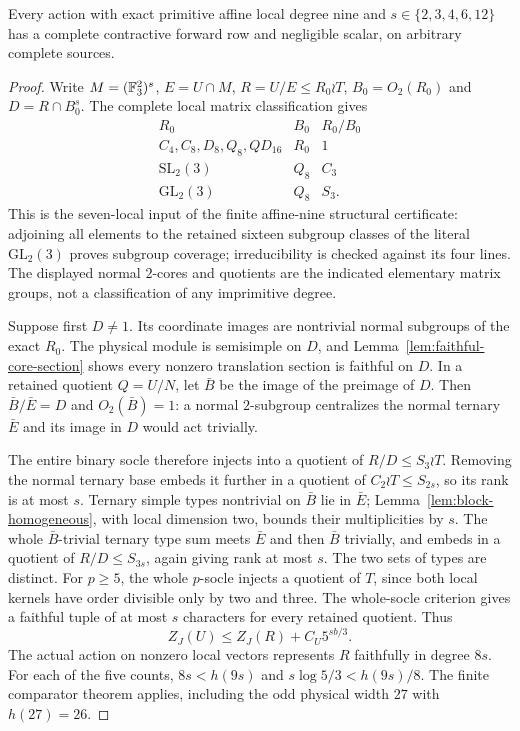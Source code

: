 \begin{theorem}
\label{thm:nine-affine-exceptions}
Every action with exact primitive affine local degree nine and
$s\in\{2,3,4,6,12\}$ has a complete contractive forward row
and negligible scalar, on arbitrary complete sources.
\end{theorem}
\begin{proof}
Write $M=(\mathbb F_3^2)^s$, $E=U\cap M$, $R=U/E\leq R_0\wr T$,
$B_0=O_2(R_0)$ and $D=R\cap B_0^s$. The complete local matrix
classification gives
\[
\begin{array}{c|c|c}
R_0&B_0&R_0/B_0\\\hline
C_4,C_8,D_8,Q_8,QD_{16}&R_0&1\\
\mathrm{SL}_2(3)&Q_8&C_3\\
\mathrm{GL}_2(3)&Q_8&S_3.
\end{array}
\]
This is the seven-local input of the finite affine-nine structural
certificate: adjoining all elements to the retained sixteen subgroup
classes of the literal $\mathrm{GL}_2(3)$ proves subgroup coverage;
irreducibility is checked against its four lines. The displayed
normal $2$-cores and quotients are the indicated elementary matrix
groups, not a classification of any imprimitive degree.

Suppose first $D\ne1$. Its coordinate images are nontrivial normal
subgroups of the exact $R_0$. The physical module is semisimple
on $D$, and Lemma~\ref{lem:faithful-core-section} shows every
nonzero translation section is faithful on $D$. In a retained
quotient $Q=U/N$, let $\bar B$ be the image of the preimage of
$D$. Then $\bar B/\bar E=D$ and $O_2(\bar B)=1$: a normal
$2$-subgroup centralizes the normal ternary $\bar E$ and its
image in $D$ would act trivially.

The entire binary socle therefore injects into a quotient of
$R/D\leq S_3\wr T$. Removing the normal ternary base embeds
it further in a quotient of $C_2\wr T\leq S_{2s}$, so its
rank is at most $s$. Ternary simple types nontrivial on $\bar B$
lie in $\bar E$; Lemma~\ref{lem:block-homogeneous}, with local
dimension two, bounds their multiplicities by $s$. The whole
$\bar B$-trivial ternary type sum meets $\bar E$ and then
$\bar B$ trivially, and embeds in a quotient of
$R/D\leq S_{3s}$, again giving rank at most $s$. The two
sets of types are distinct. For $p\geq5$, the whole $p$-socle
injects a quotient of $T$, since both local kernels have order
divisible only by two and three. The whole-socle criterion gives
a faithful tuple of at most $s$ characters for every retained
quotient. Thus
\[
 Z_J(U)\leq Z_J(R)+C_U5^{sb/3}.
\]
The actual action on nonzero local vectors represents $R$ faithfully
in degree $8s$. For each of the five counts, $8s<h(9s)$ and
$s\log5/3<h(9s)/8$. The finite comparator theorem applies,
including the odd physical width $27$ with $h(27)=26$.


\end{proof}
